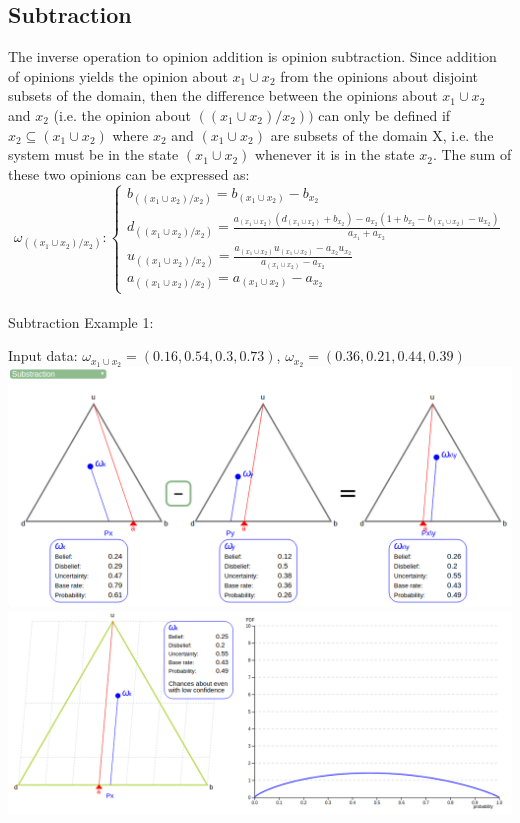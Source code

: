 \documentclass[UTF8]{article}
\newcommand{\opinion}[5]{$\omega_{#1} = (#2, #3, #4, #5)$}
\begin{document}
\subsection{Subtraction}
The inverse operation to opinion addition is opinion subtraction. Since addition
of opinions yields the opinion about $x_1 \cup x_2$ from the opinions about disjoint subsets
of the domain, then the difference between the opinions about $x_1 \cup x_2$ and $x_2$ (i.e.
the opinion about $((x_1 \cup x_2)/x_2))$ can only be defined if $x_2 \subseteq (x_1 \cup x_2)$ where $x_2$ and
$(x_1 \cup x_2)$ are subsets of the domain X, i.e. the system must be in the state $(x_1 \cup x_2)$
whenever it is in the state $x_2$. The sum of these two opinions can be expressed as:
$$
\omega_{((x_1 \cup x_2)/x_2)}: 
\begin{cases}
    b_{((x_1 \cup x_2)/x_2)} = b_{(x_1 \cup x_2)} - b_{x_2}\\    
    d_{((x_1 \cup x_2)/x_2)} = \frac{a_{(x_1 \cup x_2)}(d_{(x_1 \cup x_2)} + b_{x_2}) - a_{x_2}(1 + b_{x_2} - b_{(x_1 \cup x_2)} - u_{x_2})}{a_{x_1} + a_{x_2}}\\
    u_{((x_1 \cup x_2)/x_2)} = \frac{a_{(x_1 \cup x_2)} u_{(x_1 \cup x_2)} - a_{x_2} u_{x_2}}{a_{(x_1 \cup x_2)} - a_{x_2}}\\
    a_{((x_1 \cup x_2)/x_2)} = a_{(x_1 \cup x_2)} - a_{x_2}
\end{cases}
$$\\
Subtraction Example 1:\\
\begin{center}
    Input data: 
    \opinion{x_1 \cup x_2}{0.16}{0.54}{0.3}{0.73}, 
    \opinion{x_2}{0.36}{0.21}{0.44}{0.39}\\
    \includegraphics[width=6in]{images/sub1.png}
    \includegraphics[width=6in]{images/sub1viz.png}
\end{center}
\end{document}
